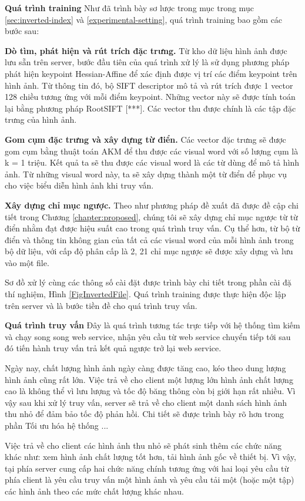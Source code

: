 \textbf{Quá trình training}
Như đã trình bày sơ lược trong mục trong mục \ref{sec:inverted-index} và \ref{experimental-setting}, quá trình training bao gồm các bước sau:

\textbf{Dò tìm, phát hiện và rút trích đặc trưng.} Từ kho dữ liệu hình ảnh được lưu sẵn trên server, bước đầu tiên của quá trình xử lý là sử dụng phương pháp phát hiện keypoint Hessian-Affine để xác định được vị trí các điểm keypoint trên hình ảnh. Từ thông tin đó, bộ SIFT descriptor mô tả và rút trích được 1 vector 128 chiều tương ứng với mỗi điểm keypoint. Những vector này sẽ được tính toán lại bằng phương pháp RootSIFT [***]. Các vector thu được chính là các tập đặc trưng của hình ảnh. 

\textbf{Gom cụm đặc trưng và xây dựng từ điển.} Các vector đặc trưng sẽ được gom cụm bằng thuật toán AKM để thu được các visual word với số lượng cụm là k = 1 triệu. Kết quả ta sẽ thu được các visual word là các từ dùng để mô tả hình ảnh. Từ những visual word này, ta sẽ xây dựng thành một từ điển để phục vụ cho việc biểu diễn hình ảnh khi truy vấn.

\textbf{Xây dựng chỉ mục ngược.} Theo như phương pháp đề xuất đã được đề cập chi tiết trong Chương \ref{chapter:proposed}, chúng tôi sẽ xây dựng chỉ mục ngược từ từ điển nhằm đạt được hiệu suất cao trong quá trình truy vấn. Cụ thể hơn, từ bộ từ điển và thông tin không gian của tất cả các visual word của mỗi hình ảnh trong bộ dữ liệu, với cấp độ phân cấp là 2, 21 chỉ mục ngược sẽ được xây dựng và lưu vào một file.

Sơ đồ xử lý cùng các thông số cài đặt được trình bày chi tiết trong phần cài đặ thí nghiệm, Hình \ref{FigInvertedFile}. Quá trình training được thực hiện độc lập trên server và là bước tiền đề cho quá trình truy vấn.

\textbf{Quá trình truy vấn}
Đây là quá trình tương tác trực tiếp với hệ thống tìm kiếm và chạy song song web service, nhận yêu cầu từ web service chuyển tiếp tới sau đó tiến hành truy vấn trả kết quả ngược trở lại web service.

Ngày nay, chất lượng hình ảnh ngày càng được tăng cao, kéo theo dung lượng hình ảnh cũng rất lớn. Việc trả về cho client một lượng lớn hình ảnh chất lượng cao là không thể vì lưu lượng và tốc độ băng thông còn bị giới hạn rất nhiều. Vì vậy sau khi xử lý truy vấn, server sẽ trả về cho client một danh sách hình ảnh thu nhỏ để đảm bảo tốc độ phản hồi. Chi tiết sẽ được trình bày rõ hơn trong phần Tối ưu hóa hệ thống ...

Việc trả về cho client các hình ảnh thu nhỏ sẽ phát sinh thêm các chức năng khác như: xem hình ảnh chất lượng tốt hơn, tải hình ảnh gốc về thiết bị. Vì vậy, tại phía server cung cấp hai chức năng chính tương ứng với hai loại yêu cầu từ phía client là yêu cầu truy vấn một hình ảnh và yêu cầu tải một (hoặc một tập) các hình ảnh theo các mức chất lượng khác nhau.

